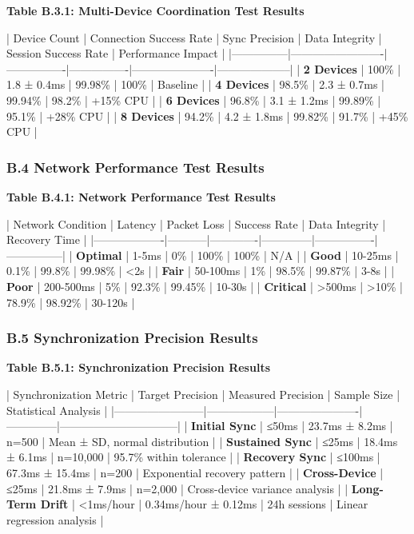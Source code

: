 \documentclass[12pt,a4paper]{article}
\begin{document}
\textbf{Table B.3.1: Multi-Device Coordination Test Results}

| Device Count  | Connection Success Rate | Sync Precision | Data Integrity | Session Success Rate | Performance Impact |
|---------------|-------------------------|----------------|----------------|----------------------|--------------------|
| \textbf{2 Devices} | 100\%                    | 1.8 ± 0.4ms    | 99.98\%         | 100\%                 | Baseline           |
| \textbf{4 Devices} | 98.5\%                   | 2.3 ± 0.7ms    | 99.94\%         | 98.2\%                | +15\% CPU           |
| \textbf{6 Devices} | 96.8\%                   | 3.1 ± 1.2ms    | 99.89\%         | 95.1\%                | +28\% CPU           |
| \textbf{8 Devices} | 94.2\%                   | 4.2 ± 1.8ms    | 99.82\%         | 91.7\%                | +45\% CPU           |

\subsubsection{B.4 Network Performance Test Results}

\textbf{Table B.4.1: Network Performance Test Results}

| Network Condition | Latency   | Packet Loss | Success Rate | Data Integrity | Recovery Time |
|-------------------|-----------|-------------|--------------|----------------|---------------|
| \textbf{Optimal}       | 1-5ms     | 0\%          | 100\%         | 100\%           | N/A           |
| \textbf{Good}          | 10-25ms   | 0.1\%        | 99.8\%        | 99.98\%         | <2s           |
| \textbf{Fair}          | 50-100ms  | 1\%          | 98.5\%        | 99.87\%         | 3-8s          |
| \textbf{Poor}          | 200-500ms | 5\%          | 92.3\%        | 99.45\%         | 10-30s        |
| \textbf{Critical}      | >500ms    | >10\%        | 78.9\%        | 98.92\%         | 30-120s       |

\subsubsection{B.5 Synchronization Precision Results}

\textbf{Table B.5.1: Synchronization Precision Results}

| Synchronization Metric | Target Precision | Measured Precision   | Sample Size  | Statistical Analysis           |
|------------------------|------------------|----------------------|--------------|--------------------------------|
| \textbf{Initial Sync}       | ≤50ms            | 23.7ms ± 8.2ms       | n=500        | Mean ± SD, normal distribution |
| \textbf{Sustained Sync}     | ≤25ms            | 18.4ms ± 6.1ms       | n=10,000     | 95.7\% within tolerance         |
| \textbf{Recovery Sync}      | ≤100ms           | 67.3ms ± 15.4ms      | n=200        | Exponential recovery pattern   |
| \textbf{Cross-Device}       | ≤25ms            | 21.8ms ± 7.9ms       | n=2,000      | Cross-device variance analysis |
| \textbf{Long-Term Drift}    | <1ms/hour        | 0.34ms/hour ± 0.12ms | 24h sessions | Linear regression analysis     |
\end{document}
